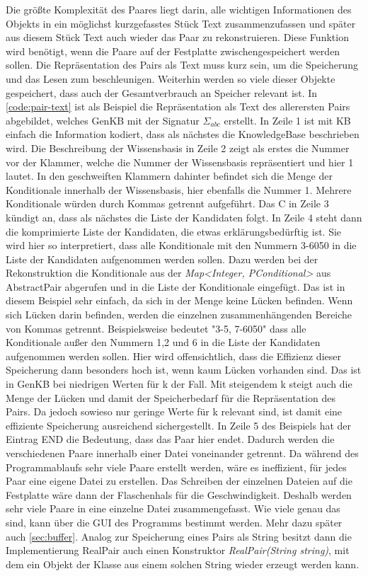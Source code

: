 \documentclass[12pt,a4paper]{article}
\begin{document}
Die größte Komplexität des Paares liegt darin, alle wichtigen Informationen des Objekts in ein möglichst kurzgefasstes Stück Text zusammenzufassen und später aus diesem Stück Text auch wieder das Paar zu rekonstruieren.  Diese Funktion wird benötigt, wenn die Paare auf der Festplatte zwischengespeichert werden sollen. Die Repräsentation des Pairs als Text muss kurz sein, um die Speicherung und das Lesen zum beschleunigen. Weiterhin werden so viele dieser Objekte gespeichert, dass auch der Gesamtverbrauch an Speicher relevant ist. In \autoref{code:pair-text} ist als Beispiel die Repräsentation als Text des allerersten Pairs abgebildet, welches GenKB mit der Signatur $\Sigma_{abc}$  erstellt. In Zeile 1 ist mit KB einfach die Information kodiert, dass als nächstes die KnowledgeBase beschrieben wird. Die Beschreibung der Wissensbasis in Zeile 2 zeigt als erstes die Nummer vor der Klammer, welche die Nummer der Wissensbasis repräsentiert und hier 1 lautet. In den geschweiften Klammern dahinter befindet sich die Menge der Konditionale innerhalb der Wissensbasis, hier ebenfalls die Nummer 1. Mehrere Konditionale würden durch Kommas getrennt aufgeführt. Das C in Zeile 3 kündigt an, dass als nächstes die Liste der Kandidaten folgt. In Zeile 4 steht dann die komprimierte Liste der Kandidaten, die etwas erklärungsbedürftig ist. Sie wird hier so interpretiert, dass alle Konditionale mit den Nummern 3-6050 in die Liste der Kandidaten aufgenommen werden sollen. Dazu werden bei der Rekonstruktion die Konditionale aus der \textit{Map<Integer, PConditional>} aus AbstractPair abgerufen und in die Liste der Konditionale eingefügt. Das ist in diesem Beispiel sehr einfach, da sich in der Menge keine Lücken befinden. Wenn sich Lücken darin befinden, werden die einzelnen zusammenhängenden Bereiche von Kommas getrennt. Beispielsweise bedeutet "3-5, 7-6050" \space dass alle Konditionale außer den Nummern 1,2 und 6 in die Liste der Kandidaten aufgenommen werden sollen. Hier wird offensichtlich, dass die Effizienz dieser Speicherung dann besonders hoch ist, wenn kaum Lücken vorhanden sind. Das ist in GenKB bei niedrigen Werten für k der Fall. Mit steigendem k steigt auch die Menge der Lücken und damit der Speicherbedarf für die Repräsentation des Pairs. Da jedoch sowieso nur geringe Werte für k relevant sind, ist damit eine effiziente Speicherung ausreichend sichergestellt. In Zeile 5 des Beispiels hat der Eintrag END die Bedeutung, dass das Paar hier endet. Dadurch werden die verschiedenen Paare innerhalb einer Datei voneinander getrennt. Da während des Programmablaufs sehr viele Paare erstellt werden, wäre es ineffizient, für jedes Paar eine eigene Datei zu erstellen. Das Schreiben der einzelnen Dateien auf die Festplatte wäre dann der Flaschenhals für die Geschwindigkeit. Deshalb werden sehr viele Paare in eine einzelne Datei zusammengefasst. Wie viele genau das sind, kann über die GUI des Programms bestimmt werden. Mehr dazu später auch \autoref{sec:buffer}. Analog zur Speicherung eines Pairs als String besitzt dann die Implementierung RealPair auch einen Konstruktor \textit{RealPair(String string)}, mit dem ein Objekt der Klasse aus einem solchen String wieder erzeugt werden kann.
\end{document}
